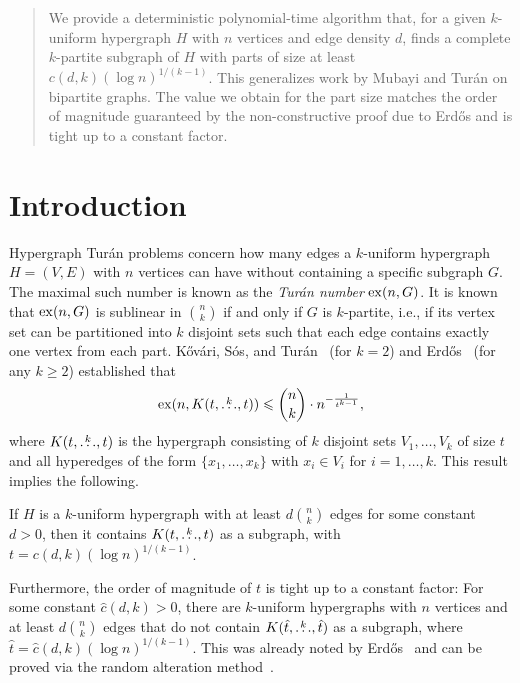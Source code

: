 \begin{abstract}
We provide a deterministic polynomial-time algorithm that, for a given $k$-uniform hypergraph $H$ with $n$ vertices and edge density $d$,
finds a complete $k$-partite subgraph of $H$ with parts of size at least ${c(d, k)(\log n)^{1/(k-1)}}$.
This generalizes work by Mubayi and Tur\'{a}n on bipartite graphs.
The value we obtain for the part size matches the order of magnitude guaranteed by the non-constructive proof due to
Erd\H{o}s and is tight up to a constant factor.
\end{abstract}

\maketitle


\section{Introduction}\label{sec:introduction}

Hypergraph Tur\'{a}n problems concern how many edges a $k$-uniform hypergraph $H = (V, E)$ with $n$ vertices can have without containing a specific subgraph $G$.
The maximal such number is known as the \emph{Tur\'{a}n number} $\mathrm{ex}(n, G)$.
It is known~\cite{keevash2011hypergraph}
that $\mathrm{ex}(n, G)$ is sublinear in $\binom{n}{k}$ if and only if $G$ is $k$-partite, i.e.,
if its vertex set can be partitioned into $k$ disjoint sets such that each edge contains exactly one vertex from each part.
K\H{o}v\'{a}ri, S\'{o}s, and Tur\'{a}n~\cite{Kovari1954} (for $k=2$) and
Erd\H{o}s~\cite{Erdos1964} (for any $k \geq 2$) established that
\[
    \mathrm{ex}(n, K(t, \overset{k}{\dots}, t)) \leqslant \binom{n}{k} \cdot n^{-\frac{1}{t^{k-1}}},
\]
where $K(t, \overset{k}{\dots}, t)$ is the hypergraph consisting of $k$ disjoint sets $V_1, \dots, V_k$ of size $t$
and all hyperedges of the form $\{x_1, \dots, x_k\}$ with $x_i \in V_i$ for $i = 1, \dots, k$.
This result implies the following.

\begin{remark} \label{rk:order}
    If $H$ is a $k$-uniform hypergraph with at least $d \binom{n}{k}$ edges for some constant $d > 0$, then it contains $K(t, \overset{k}{\dots}, t)$
    as a subgraph, with $t = c(d, k) (\log n)^{1/(k-1)}$.
\end{remark}

Furthermore, the order of magnitude of $t$ is tight up to a constant factor:
For some constant $\hat{c}(d, k) > 0$,
there are $k$-uniform hypergraphs with $n$ vertices and at least $d \binom{n}{k}$ edges
that do not contain $K(\hat{t}, \overset{k}{\dots}, \hat{t})$ as a subgraph, where
$\hat{t} = \hat{c}(d, k)(\log n)^{1/(k-1)}$.
This was already noted by Erd\H{o}s~\cite{Erdos1964} and can be proved via the random alteration method~\cite{alon2016probabilistic}.


